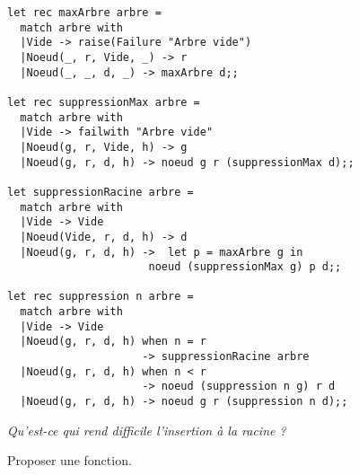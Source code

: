 \begin{Answer} 
\begin{lstlisting}
let rec maxArbre arbre = 
  match arbre with
  |Vide -> raise(Failure "Arbre vide")
  |Noeud(_, r, Vide, _) -> r
  |Noeud(_, _, d, _) -> maxArbre d;;

let rec suppressionMax arbre = 
  match arbre with
  |Vide -> failwith "Arbre vide"
  |Noeud(g, r, Vide, h) -> g
  |Noeud(g, r, d, h) -> noeud g r (suppressionMax d);;

let suppressionRacine arbre = 
  match arbre with
  |Vide -> Vide
  |Noeud(Vide, r, d, h) -> d
  |Noeud(g, r, d, h) ->  let p = maxArbre g in
                      noeud (suppressionMax g) p d;;

let rec suppression n arbre = 
  match arbre with
  |Vide -> Vide
  |Noeud(g, r, d, h) when n = r 
                     -> suppressionRacine arbre
  |Noeud(g, r, d, h) when n < r 
                     -> noeud (suppression n g) r d
  |Noeud(g, r, d, h) -> noeud g r (suppression n d);;
\end{lstlisting}

\newpage
\end{Answer}
\begin{Exercise}\it 
Qu'est-ce qui rend difficile l'insertion à la racine ?

Proposer une fonction.
\end{Exercise}
